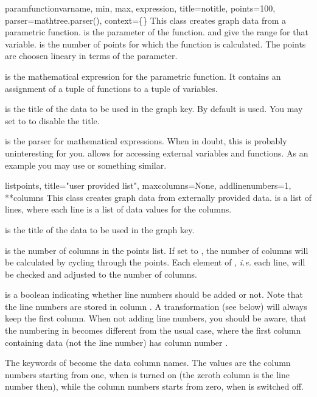 \begin{classdesc}{paramfunction}{varname, min, max, expression,
                                 title=notitle, points=100,
                                 parser=mathtree.parser(),
                                 context=\{\}}
  This class creates graph data from a parametric function.
   is the parameter of the function.  and
   give the range for that variable.  is the
  number of points for which the function is calculated. The points
  are choosen lineary in terms of the parameter.

   is the mathematical expression for the parametric
  function. It contains an assignment of a tuple of functions to a
  tuple of variables.

   is the title of the data to be used in the graph key. By
  default  is used. You may set  to
   to disable the title.

   is the parser for mathematical expressions. When in
  doubt, this is probably uninteresting for you.  allows
  for accessing external variables and functions. As an example you
  may use  or something similar.
\end{classdesc}

\begin{classdesc}{list}{points, title="user provided list",
                        maxcolumns=None, addlinenumbers=1, **columns}
  This class creates graph data from externally provided data.
   is a list of lines, where each line is a list of data
  values for the columns.

   is the title of the data to be used in the graph key.

   is the number of columns in the points list. If set
  to , the number of columns will be calculated by cycling
  through the points. Each element of , \emph{i.e.} each
  line, will be checked and adjusted to the number of columns.

   is a boolean indicating whether line numbers
  should be added or not. Note that the line numbers are stored in
  column . A transformation (see  below) will
  always keep the first column. When not adding line numbers, you
  should be aware, that the numbering in  becomes
  different from the usual case, where the first column containing
  data (not the line number) has column number .

  The keywords of  become the data column names. The
  values are the column numbers starting from one, when
   is turned on (the zeroth column is the line
  number then), while the column numbers starts from zero, when
   is switched off.
\end{classdesc}

